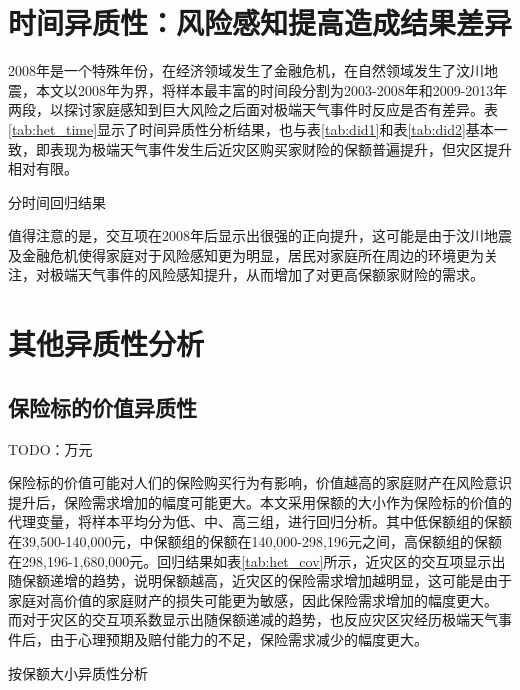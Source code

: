 \section{时间异质性：风险感知提高造成结果差异}
2008年是一个特殊年份，在经济领域发生了金融危机，在自然领域发生了汶川地震，本文以2008年为界，将样本最丰富的时间段分割为2003-2008年和2009-2013年两段，以探讨家庭感知到巨大风险之后面对极端天气事件时反应是否有差异。表\ref{tab:het_time}显示了时间异质性分析结果，也与表\ref{tab:did1}和表\ref{tab:did2}基本一致，即表现为极端天气事件发生后近灾区购买家财险的保额普遍提升，但灾区提升相对有限。

\begin{table}[ht]
    \centering
    \renewcommand{\arraystretch}{1}
    \caption{分时间回归结果}\label{tab:het_time}
    
\end{table}

值得注意的是，交互项在2008年后显示出很强的正向提升，这可能是由于汶川地震及金融危机使得家庭对于风险感知更为明显，居民对家庭所在周边的环境更为关注，对极端天气事件的风险感知提升，从而增加了对更高保额家财险的需求。

\section{其他异质性分析}
\subsection{保险标的价值异质性}
TODO：万元

保险标的价值可能对人们的保险购买行为有影响，价值越高的家庭财产在风险意识提升后，保险需求增加的幅度可能更大。本文采用保额的大小作为保险标的价值的代理变量，将样本平均分为低、中、高三组，进行回归分析。其中低保额组的保额在39,500-140,000元，中保额组的保额在140,000-298,196元之间，高保额组的保额在298,196-1,680,000元。回归结果如表\ref{tab:het_cov}所示，近灾区的交互项显示出随保额递增的趋势，说明保额越高，近灾区的保险需求增加越明显，这可能是由于家庭对高价值的家庭财产的损失可能更为敏感，因此保险需求增加的幅度更大。
而对于灾区的交互项系数显示出随保额递减的趋势，也反应灾区灾经历极端天气事件后，由于心理预期及赔付能力的不足，保险需求减少的幅度更大。
\begin{table}
    \centering
    \caption{按保额大小异质性分析}\label{tab:het_cov}
    
\end{table}


